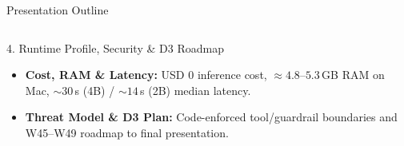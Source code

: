 \documentclass[aspectratio=1610,11pt]{beamer}
\begin{document}
\begin{frame}{Presentation Outline}
\begin{columns}[T]
    \begin{block}{4. Runtime Profile, Security \& D3 Roadmap}
      \scriptsize
      \begin{itemize}\scriptsize
        \item \textbf{Cost, RAM \& Latency:} USD 0 inference cost, $\approx 4.8\text{--}5.3$\,GB RAM on Mac, $\sim 30$\,s (4B) / $\sim 14$\,s (2B) median latency.
        \item \textbf{Threat Model \& D3 Plan:} Code-enforced tool/guardrail boundaries and W45--W49 roadmap to final presentation.
      \end{itemize}
    \end{block}
  \end{columns}
\end{frame}

\end{document}
